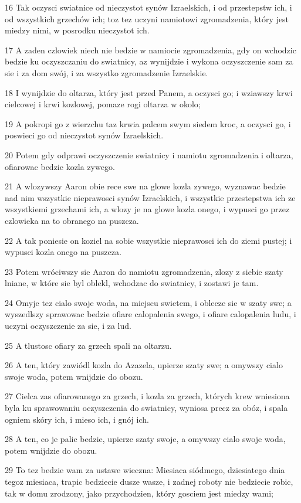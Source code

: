 \par 16 Tak oczysci swiatnice od nieczystot synów Izraelskich, i od przestepstw ich, i od wszystkich grzechów ich; toz tez uczyni namiotowi zgromadzenia, który jest miedzy nimi, w posrodku nieczystot ich.
\par 17 A zaden czlowiek niech nie bedzie w namiocie zgromadzenia, gdy on wchodzic bedzie ku oczyszczaniu do swiatnicy, az wynijdzie i wykona oczyszczenie sam za sie i za dom swój, i za wszystko zgromadzenie Izraelskie.
\par 18 I wynijdzie do oltarza, który jest przed Panem, a oczysci go; i wziawszy krwi cielcowej i krwi kozlowej, pomaze rogi oltarza w okolo;
\par 19 A pokropi go z wierzchu taz krwia palcem swym siedem kroc, a oczysci go, i poswieci go od nieczystot synów Izraelskich.
\par 20 Potem gdy odprawi oczyszczenie swiatnicy i namiotu zgromadzenia i oltarza, ofiarowac bedzie kozla zywego.
\par 21 A wlozywszy Aaron obie rece swe na glowe kozla zywego, wyznawac bedzie nad nim wszystkie nieprawosci synów Izraelskich, i wszystkie przestepstwa ich ze wszystkiemi grzechami ich, a wlozy je na glowe kozla onego, i wypusci go przez czlowieka na to obranego na puszcza.
\par 22 A tak poniesie on koziel na sobie wszystkie nieprawosci ich do ziemi pustej; i wypusci kozla onego na puszcza.
\par 23 Potem wróciwszy sie Aaron do namiotu zgromadzenia, zlozy z siebie szaty lniane, w które sie byl oblekl, wchodzac do swiatnicy, i zostawi je tam.
\par 24 Omyje tez cialo swoje woda, na miejscu swietem, i oblecze sie w szaty swe; a wyszedlszy sprawowac bedzie ofiare calopalenia swego, i ofiare calopalenia ludu, i uczyni oczyszczenie za sie, i za lud.
\par 25 A tlustosc ofiary za grzech spali na oltarzu.
\par 26 A ten, który zawiódl kozla do Azazela, upierze szaty swe; a omywszy cialo swoje woda, potem wnijdzie do obozu.
\par 27 Cielca zas ofiarowanego za grzech, i kozla za grzech, których krew wniesiona byla ku sprawowaniu oczyszczenia do swiatnicy, wyniosa precz za obóz, i spala ogniem skóry ich, i mieso ich, i gnój ich.
\par 28 A ten, co je palic bedzie, upierze szaty swoje, a omywszy cialo swoje woda, potem wnijdzie do obozu.
\par 29 To tez bedzie wam za ustawe wieczna: Miesiaca siódmego, dziesiatego dnia tegoz miesiaca, trapic bedziecie dusze wasze, i zadnej roboty nie bedziecie robic, tak w domu zrodzony, jako przychodzien, który gosciem jest miedzy wami;
